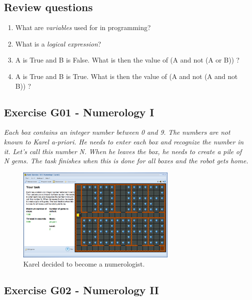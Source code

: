 \documentclass[article,A4,12pt]{llncs}
\begin{document}
\subsection{Review questions}

\begin{enumerate}
\item What are {\em variables} used for in programming? 
\item What is a {\em logical expression}? 
\item A is True and B is False. What is then the value of (A and not (A or B)) ?
\item A is True and B is True. What is then the value of (A and not (A and not B)) ?
\end{enumerate}

\subsection{Exercise G01 - Numerology I}

{\em Each box contains an integer number between 0 and 9. The numbers are not known to Karel a-priori. He needs to enter each box and recognize the number in it. Let's call this number N. When he leaves the box, he needs to create a pile of N gems. The task finishes when this is done for all boxes and the robot gets home.}

\begin{figure}[!ht]
\begin{center}
\includegraphics[width=0.7\textwidth]{img/g10.png}
\end{center}
\vspace{-4mm}
\caption{Karel decided to become a numerologist.}
\label{fig:g10}
\vspace{-4mm}
\end{figure}
\noindent

\subsection{Exercise G02 - Numerology II}
\end{document}

